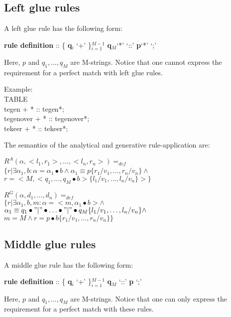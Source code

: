 \subsection{Left glue rules }
A left glue rule has the following form:
\small
\begin{code}
{\bf rule definition } :: \{ {\bf q$_{i}$} `+' \}$_{i=1}^{M-1}$ {\bf q$_{M}$}`*' `::' {\bf p}`*' `;' \\
\end{code}
\normalsize
Here, $p$ and $q_{1},\ldots,q_{M}$ are M-strings. Notice that one cannot
express the requirement for a perfect match with left glue rules.

\small
\begin{code}
Example: \\
\>TABLE\\
\>\>tegen     + * :: tegen*;\\
\>\>tegenover + * :: tegenover*;\\
\>\>tekeer    + * :: tekeer*;\\
\end{code}
\normalsize

The semantics of the analytical and generative rule-application are:
\small
\begin{code}
$R^{A}(\alpha,<l_{1},r_{1}>, \ldots ,<l_{n},r_{n}>) =_{def}$\\
\>$\{ r | \exists \alpha_{1}, b : \alpha = \alpha_{1}\bullet b \wedge \alpha_{1} \equiv p\{r_{1}/v_{1},\ldots,r_{n}/v_{n}\} \wedge$\
\
\>$r = <M, <q_{1},\ldots,q_{M}\bullet b>\{l_{1}/v_{1},\ldots,l_{n}/v_{n}\}> \}$\\
\end{code}
\normalsize
\small
\begin{code}
$R^{G}(\alpha,d_{1}, \ldots ,d_{n}) =_{def}$\\
\>$\{ r | \exists \alpha_{1}, b, m : \alpha = <m, \alpha_{1}\bullet b> \wedge $\\
\>$\alpha_{1} \equiv q_{1}\bullet"|"\bullet\ldots\bullet "|"\bullet q_{M}\{l_{1}/v_{1},\ldots,l_{n}/v_{n}\} \wedge$\\
\>$m = M \wedge r = p\bullet b\{r_{1}/v_{1},\ldots,r_{n}/v_{n}\} \}$\\
\end{code}
\normalsize
\subsection{Middle glue rules }
A middle glue rule has the following form:
\small
\begin{code}
{\bf rule definition } :: \{ {\bf q$_{i}$} `+' \}$_{i=1}^{M-1}$ {\bf q$_{M}$} `::' {\bf p} `;' \\
\end{code}
\normalsize
Here, $p$ and $q_{1},\ldots,q_{M}$ are M-strings. Notice that one can only
express the requirement for a perfect match with these rules.

